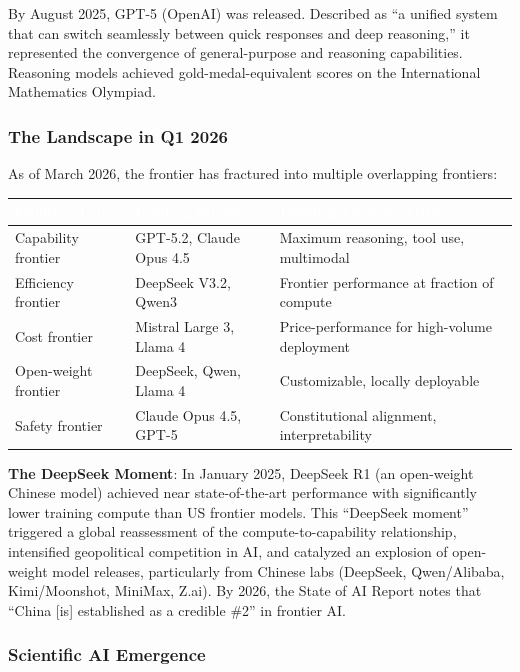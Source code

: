 \documentclass[11pt,letterpaper]{article}
\newcommand{\tableheader}[1]{\textbf{\sffamily\textcolor{white}{#1}}}
\begin{document}
By August 2025, GPT-5 (OpenAI) was released. Described as ``a unified system that can switch seamlessly between quick responses and deep reasoning,'' it represented the convergence of general-purpose and reasoning capabilities. Reasoning models achieved gold-medal-equivalent scores on the International Mathematics Olympiad.

\subsubsection{The Landscape in Q1 2026}

As of March 2026, the frontier has fractured into multiple overlapping frontiers:

\begin{center}
\begin{tabularx}{\textwidth}{L{3cm}L{4cm}X}
\toprule
{}
\tableheader{Frontier Type} & \tableheader{Leading Models} & \tableheader{Defining Characteristic} \\
\midrule
Capability frontier & GPT-5.2, Claude Opus 4.5 & Maximum reasoning, tool use, multimodal \\
Efficiency frontier & DeepSeek V3.2, Qwen3 & Frontier performance at fraction of compute \\
Cost frontier & Mistral Large 3, Llama 4 & Price-performance for high-volume deployment \\
Open-weight frontier & DeepSeek, Qwen, Llama 4 & Customizable, locally deployable \\
Safety frontier & Claude Opus 4.5, GPT-5 & Constitutional alignment, interpretability \\
\bottomrule
\end{tabularx}
\end{center}

\textbf{The DeepSeek Moment}: In January 2025, DeepSeek R1 (an open-weight Chinese model) achieved near state-of-the-art performance with significantly lower training compute than US frontier models. This ``DeepSeek moment'' triggered a global reassessment of the compute-to-capability relationship, intensified geopolitical competition in AI, and catalyzed an explosion of open-weight model releases, particularly from Chinese labs (DeepSeek, Qwen/Alibaba, Kimi/Moonshot, MiniMax, Z.ai). By 2026, the State of AI Report notes that ``China [is] established as a credible \#2'' in frontier AI.

\subsubsection{Scientific AI Emergence}
\end{document}
